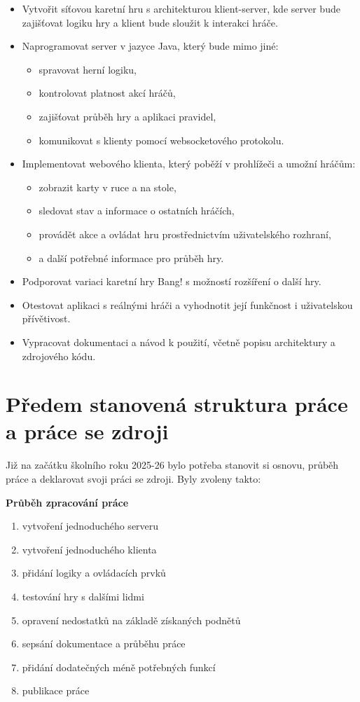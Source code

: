 \begin{itemize}
    \item Vytvořit síťovou karetní hru s architekturou klient-server, kde server bude zajišťovat logiku hry a klient bude sloužit k interakci hráče.
    \item Naprogramovat server v jazyce Java, který bude mimo jiné:
    \begin{itemize}
        \item spravovat herní logiku,
        \item kontrolovat platnost akcí hráčů,
        \item zajišťovat průběh hry a aplikaci pravidel,
        \item komunikovat s klienty pomocí websocketového protokolu.
    \end{itemize}
    \item Implementovat webového klienta, který poběží v prohlížeči a umožní hráčům:
    \begin{itemize}
        \item zobrazit karty v ruce a na stole,
        \item sledovat stav a informace o ostatních hráčích,
        \item provádět akce a ovládat hru prostřednictvím uživatelského rozhraní,
        \item a další potřebné informace pro průběh hry.
    \end{itemize}
    \item Podporovat variaci karetní hry Bang! s možností rozšíření o další hry.
    \item Otestovat aplikaci s reálnými hráči a vyhodnotit její funkčnost i uživatelskou přívětivost.
    \item Vypracovat dokumentaci a návod k použití, včetně popisu architektury a zdrojového kódu.
\end{itemize}


\section{Předem stanovená struktura práce a práce se zdroji}
Již na začátku školního roku 2025-26 bylo potřeba stanovit si osnovu, průběh práce a deklarovat svoji práci se zdroji. Byly zvoleny takto:

\textbf{Průběh zpracování práce}
\begin{enumerate}
    \item vytvoření jednoduchého serveru
    \item vytvoření jednoduchého klienta
    \item přidání logiky a ovládacích prvků
    \item testování hry s dalšími lidmi
    \item opravení nedostatků na základě získaných podnětů
    \item sepsání dokumentace a průběhu práce
    \item přidání dodatečných méně potřebných funkcí
    \item publikace práce
\end{enumerate}

